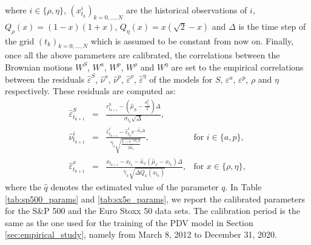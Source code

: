 where $i\in\{\rho,\eta \}$, $(x^i_{t_k})_{k=0,\dots,N}$ are the historical observations of $i$, $Q_{\rho}(x)=(1-x)(1+x)$, $Q_{\eta}(x)=x(\sqrt{2}-x)$ and $\Delta$ is the time step of the grid $(t_k)_{k=0,\dots,N}$ which is assumed to be constant from now on. Finally, once all the above parameters are calibrated, the correlations between the Brownian motions $W^S$, $W^a$, $W^p$, $W^{\rho}$ and $W^{\eta}$ are set to the empirical correlations between the residuals $\hat{\varepsilon}^S$, $\hat{\nu}^a$, $\hat{\nu}^p$, $\hat{\varepsilon}^{\rho}$, $\hat{\varepsilon}^{\eta}$ of the models for $S$, $\varepsilon^a$, $\varepsilon^p$, $\rho$ and $\eta$ respectively. These residuals are computed as:
\begin{equation*}
    \begin{array}{rcll}
        \hat{\varepsilon}^S_{t_{k+1}} &=& \displaystyle\frac{r^h_{t_{k+1}}-\left(\hat{\mu}_S-\frac{\sigma_{t_k}^2}{2}\right)\Delta}{\sigma_{t_k}\sqrt{\Delta}}, \\
        \hat{\nu}^i_{t_{k+1}} &=& \displaystyle\frac{\hat{\varepsilon}^i_{t_{k+1}}-\hat{\varepsilon}^i_{t_{k}}e^{-\hat{\kappa}_i\Delta}}{\hat{\gamma}_i\sqrt{\frac{1-e^{-2\hat{\kappa}_i\Delta}}{2\hat{\kappa}_i}}},& \text{for } i \in \{a,p\}, \\
        \hat{\varepsilon}^x_{t_{k+1}} &=& \displaystyle \frac{x_{t_{k+1}}-x_{t_k}-\hat{\kappa}_x(\hat{\mu}_x-x_{t_k})\Delta}{\hat{\gamma}_x\sqrt{\Delta Q_x(x_{t_k})}}, & \text{for } x \in \{\rho,\eta\},  
    \end{array}
\end{equation*}
where the $\hat{q}$ denotes the estimated value of the parameter $q$. In Table \ref{tab:sp500_params} and \ref{tab:sx5e_params}, we report the calibrated parameters for the S\&P 500 and the Euro Stoxx 50 data sets. The calibration period is the same as the one used for the training of the PDV model in Section \ref{sec:empirical_study}, namely from March 8, 2012 to December 31, 2020. 



